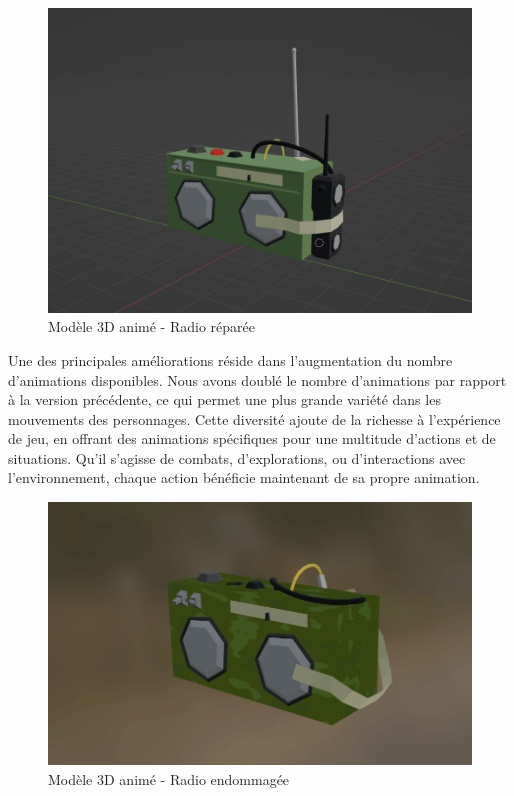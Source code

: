 \documentclass[
	article,			%
	11pt,				%
	oneside,			%
	a4paper,			%
	chapter=TITLE,
	french,			%
	sumario=tradicional
	]{base_nt}
\begin{document}
\begin{figure}[ht]
	\caption{Modèle 3D animé - Radio réparée}
	\centering
	\includegraphics[width=1\linewidth]{paper15.png}
	\legend{}
	
\end{figure}

Une des principales améliorations réside dans l'augmentation du nombre d'animations disponibles. Nous avons doublé le nombre d'animations par rapport à la version précédente, ce qui permet une plus grande variété dans les mouvements des personnages. Cette diversité ajoute de la richesse à l'expérience de jeu, en offrant des animations spécifiques pour une multitude d'actions et de situations. Qu'il s'agisse de combats, d'explorations, ou d'interactions avec l'environnement, chaque action bénéficie maintenant de sa propre animation.

\begin{figure}[ht]
	\caption{Modèle 3D animé - Radio endommagée}
	\centering
	\includegraphics[width=1\linewidth]{paper14.png}
	\legend{}
	
\end{figure}
\end{document}
